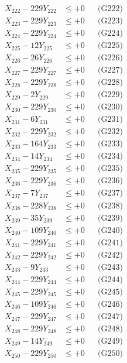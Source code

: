 \documentclass[a4paper,10pt]{article}
\begin{document}
{\begin{align}
X_{222} - 229Y_{222} &\leq +0 && \text{(G222)} \\
X_{223} - 229Y_{223} &\leq +0 && \text{(G223)} \\
X_{224} - 229Y_{224} &\leq +0 && \text{(G224)} \\
X_{225} - 12Y_{225} &\leq +0 && \text{(G225)} \\
X_{226} - 26Y_{226} &\leq +0 && \text{(G226)} \\
X_{227} - 229Y_{227} &\leq +0 && \text{(G227)} \\
X_{228} - 229Y_{228} &\leq +0 && \text{(G228)} \\
X_{229} - 2Y_{229} &\leq +0 && \text{(G229)} \\
X_{230} - 229Y_{230} &\leq +0 && \text{(G230)} \\
\allowbreak
X_{231} - 6Y_{231} &\leq +0 && \text{(G231)} \\
X_{232} - 229Y_{232} &\leq +0 && \text{(G232)} \\
X_{233} - 164Y_{233} &\leq +0 && \text{(G233)} \\
X_{234} - 14Y_{234} &\leq +0 && \text{(G234)} \\
X_{235} - 229Y_{235} &\leq +0 && \text{(G235)} \\
X_{236} - 229Y_{236} &\leq +0 && \text{(G236)} \\
X_{237} - 7Y_{237} &\leq +0 && \text{(G237)} \\
X_{238} - 228Y_{238} &\leq +0 && \text{(G238)} \\
X_{239} - 35Y_{239} &\leq +0 && \text{(G239)} \\
X_{240} - 109Y_{240} &\leq +0 && \text{(G240)} \\
\allowbreak
X_{241} - 229Y_{241} &\leq +0 && \text{(G241)} \\
X_{242} - 229Y_{242} &\leq +0 && \text{(G242)} \\
X_{243} - 9Y_{243} &\leq +0 && \text{(G243)} \\
X_{244} - 229Y_{244} &\leq +0 && \text{(G244)} \\
X_{245} - 229Y_{245} &\leq +0 && \text{(G245)} \\
X_{246} - 109Y_{246} &\leq +0 && \text{(G246)} \\
X_{247} - 229Y_{247} &\leq +0 && \text{(G247)} \\
X_{248} - 229Y_{248} &\leq +0 && \text{(G248)} \\
X_{249} - 14Y_{249} &\leq +0 && \text{(G249)} \\
X_{250} - 229Y_{250} &\leq +0 && \text{(G250)} \\

\end{align}}
\end{document}
